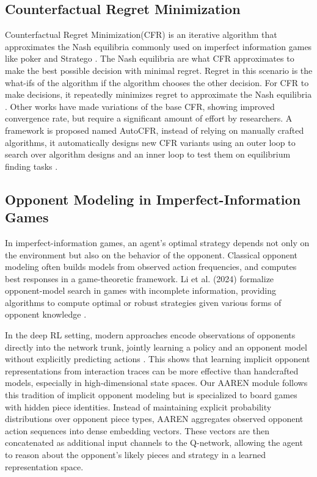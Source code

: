 \subsection{Counterfactual Regret Minimization}
Counterfactual Regret Minimization(CFR) is an iterative algorithm that approximates the Nash equilibria commonly used on imperfect information games like poker and Stratego \cite{CFRMIX,xu2024dynamic}. The Nash equilibria are what CFR approximates to make the best possible decision with minimal regret. Regret in this scenario is the what-ifs of the algorithm if the algorithm chooses the other decision. For CFR to make decisions, it repeatedly minimizes regret to approximate the Nash equilibria \cite{CFRMIX}. Other works have made variations of the base CFR, showing improved convergence rate, but require a significant amount of effort by researchers. A framework is proposed named AutoCFR, instead of relying on manually crafted algorithms, it automatically designs new CFR variants using an outer loop to search over algorithm designs and an inner loop to test them on equilibrium finding tasks \cite{xu2022autocfr}. 

\subsection{Opponent Modeling in Imperfect-Information Games}
In imperfect-information games, an agent’s optimal strategy depends not only on the environment but also on the behavior of the opponent. Classical opponent modeling often builds models from observed action frequencies, and computes best responses in a game-theoretic framework. Li et al. (2024) formalize opponent-model search in games with incomplete information, providing algorithms to compute optimal or robust strategies given various forms of opponent knowledge \cite{li2024opponent}.

In the deep RL setting, modern approaches encode observations of opponents directly into the network trunk, jointly learning a policy and an opponent model without explicitly predicting actions \cite{DRLImperfectInfo2023}. This shows that learning implicit opponent representations from interaction traces can be more effective than handcrafted models, especially in high-dimensional state spaces. Our AAREN module follows this tradition of implicit opponent modeling but is specialized to board games with hidden piece identities. Instead of maintaining explicit probability distributions over opponent piece types, AAREN aggregates observed opponent action sequences into dense embedding vectors. These vectors are then concatenated as additional input channels to the Q-network, allowing the agent to reason about the opponent’s likely pieces and strategy in a learned representation space.




